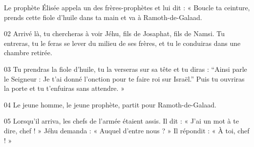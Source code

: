 Le prophète Élisée appela un des frères-prophètes et lui dit : « Boucle ta ceinture, prends cette fiole d’huile dans ta main et va à Ramoth-de-Galaad.

02 Arrivé là, tu chercheras à voir Jéhu, fils de Josaphat, fils de Namsi. Tu entreras, tu le feras se lever du milieu de ses frères, et tu le conduiras dans une chambre retirée.

03 Tu prendras la fiole d’huile, tu la verseras sur sa tête et tu diras : “Ainsi parle le Seigneur : Je t’ai donné l’onction pour te faire roi sur Israël.” Puis tu ouvriras la porte et tu t’enfuiras sans attendre. »

04 Le jeune homme, le jeune prophète, partit pour Ramoth-de-Galaad.

05 Lorsqu’il arriva, les chefs de l’armée étaient assis. Il dit : « J’ai un mot à te dire, chef ! » Jéhu demanda : « Auquel d’entre nous ? » Il répondit : « À toi, chef ! »

